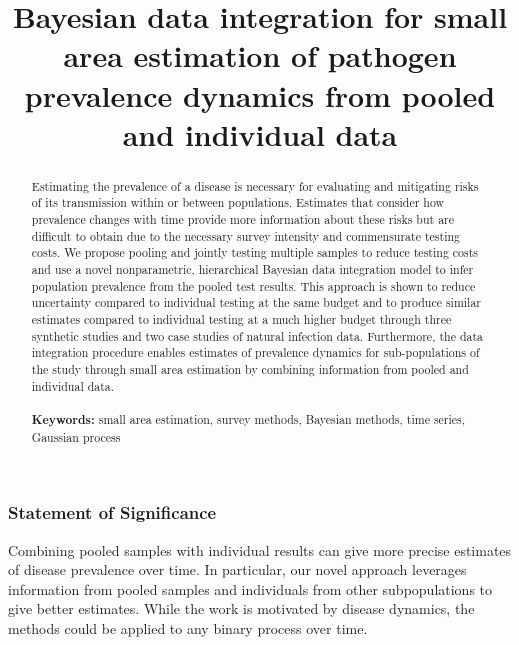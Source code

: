 \documentclass{article}
\title{Bayesian data integration for small area estimation of pathogen prevalence dynamics from pooled and individual data}
\begin{document}
\maketitle


\begin{abstract}
\noindent
Estimating the prevalence of a disease is necessary for evaluating and mitigating risks of its transmission within or between populations. Estimates that consider how prevalence changes with time provide more information about these risks but are difficult to obtain due to the necessary survey intensity and commensurate testing costs. We propose pooling and jointly testing multiple samples to reduce testing costs and use a novel nonparametric, hierarchical Bayesian data integration model to infer population prevalence from the pooled test results. This approach is shown to reduce uncertainty compared to individual testing at the same budget and to produce similar estimates compared to individual testing at a much higher budget through three synthetic studies and two case studies of natural infection data. Furthermore, the data integration procedure enables estimates of prevalence dynamics for sub-populations of the study through small area estimation by combining information from pooled and individual data.\\
\\
{\bf Keywords:} small area estimation, survey methods, Bayesian methods, time series, Gaussian process
\end{abstract}

\subsubsection*{Statement of Significance}
Combining pooled samples with individual results can give more precise estimates of disease prevalence over time. In particular, our novel approach leverages information from pooled samples and individuals from other subpopulations to give better estimates. While the work is motivated by disease dynamics, the methods could be applied to any binary process over time.
\end{document}
